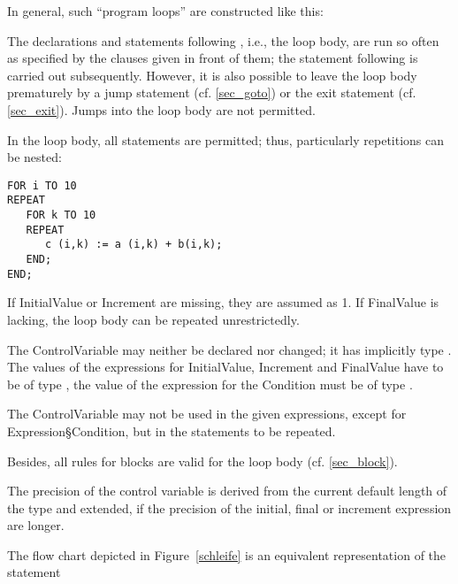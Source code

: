 In general, such ``program loops'' are constructed like this:

\begin{grammarframe}


\end{grammarframe}
The declarations and statements following , i.e., the loop body,
are run so often as specified by the clauses given in front of them; the
statement following  is carried out subsequently. However, it is also
possible to leave the loop body prematurely by a jump statement (cf. \ref{sec_goto})
or the exit statement (cf. \ref{sec_exit}). Jumps into the loop body are not permitted.

In the loop body, all statements are permitted; thus, particularly
repetitions can be nested:

\begin{lstlisting}
FOR i TO 10
REPEAT
   FOR k TO 10 
   REPEAT 
      c (i,k) := a (i,k) + b(i,k);
   END;
END;
\end{lstlisting}

If InitialValue or Increment are missing, they are assumed as 1. 
If FinalValue is lacking, the loop body can be repeated unrestrictedly.

The ControlVariable may neither be declared nor changed; it has
implicitly type . The values of the expressions for InitialValue,
Increment and FinalValue have to be of type , the value of the
expression for the Condition must be of type .

The ControlVariable may not be used in the given expressions, except
for Expression\S Condition, but in the statements to be repeated.

Besides, all rules for blocks are valid for the loop body (cf. \ref{sec_block}).

The precision of the control variable is derived from the current default
 length of the type  and extended,
 if the precision of the initial, final or increment expression are longer.

The flow chart depicted in Figure~\ref{schleife} is an equivalent representation of the
statement

